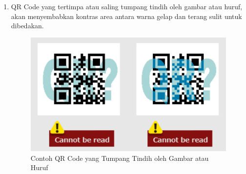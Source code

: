 \begin{enumerate}
	\item QR Code yang tertimpa atau saling tumpang tindih oleh gambar atau huruf, akan menyembabkan kontras area antara warna gelap dan terang sulit untuk dibedakan.
	\begin{figure}[H]
		\centering
		\includegraphics[scale=1]{Gambar/qrTimpa.png}
		\caption{Contoh QR Code yang Tumpang Tindih oleh Gambar atau Huruf} 
		\label{fig:qrTimpa}
	\end{figure}
\end{enumerate}


